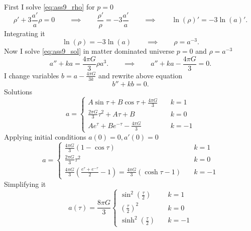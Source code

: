 \subproblem

First I solve \cref{eq:ass9_rho} for $p=0$
%
\begin{equation}
    \rho' + 3 \frac{a'}{a}\rho  = 0
    \qquad\implies\qquad
    \frac{\rho'}{\rho} = -3 \frac{a'}{a}
    \qquad\implies\qquad
    \ln(\rho)' = -3 \ln(a)'.
\end{equation}
%
Integrating it
%
\begin{equation}
    \ln(\rho) = -3\ln(a)
    \qquad\implies\qquad
    \rho = a^{-3}.
\end{equation}
%
Now I solve \cref{eq:ass9_sol} in matter dominated universe $p=0$ and
$\rho=a^{-3}$
%
\begin{equation}
    a'' + ka =
    \frac{4\pi G}{3} \rho a^3.
    \qquad\implies\qquad
    a'' + ka - \frac{4\pi G}{3} = 0.
\end{equation}
%
I change variables $b = a - \frac{4\pi G}{3k}$ and rewrite above equation
%
\begin{equation}
    b'' + kb = 0.
\end{equation}
%
Solutions
%
\begin{equation}
    a = \begin{cases}
        A \sin \tau + B\cos\tau + \frac{4\pi G}{3} & \quad k=1  \\
        \frac{2\pi G}{3}\tau^2 + A\tau + B         & \quad k=0  \\
        A e^{\tau} + Be^{-\tau} - \frac{4\pi G}{3} & \quad k=-1
    \end{cases}
\end{equation}
%
Applying initial conditions $a(0)=0, a'(0)=0$
%
\begin{equation}
    a = \begin{cases}
        \frac{4\pi G}{3} \left(1 -  \cos\tau\right) & \quad k=1  \\
        \frac{2\pi G}{3}\tau^2                      & \quad k=0  \\
        \frac{4\pi G}{3} \left(\frac{e^{\tau} + e^{-\tau}}{2} - 1\right)=
        \frac{4\pi G}{3} \left(\cosh\tau - 1\right) & \quad k=-1
    \end{cases}
\end{equation}
%
Simplifying it
%
\begin{equation}
    \boxed{a(\tau) = \frac{8\pi G}{3}
        \begin{cases}
            \sin^2\left(\frac{\tau}{2}\right)  & \quad k=1  \\
            \left(\frac{\tau}{2}\right)^2      & \quad k=0  \\
            \sinh^2\left(\frac{\tau}{2}\right) & \quad k=-1
        \end{cases}}
\end{equation}
